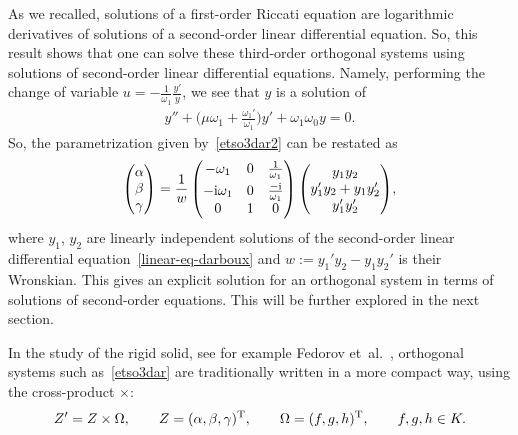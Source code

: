 \documentclass[pdftex]{sigma}%
\numberwithin{equation}{section}
\begin{document}
\begin{Remark}\label{rmk-darboux-thm2}
As we recalled, solutions of a first-order Riccati equation are logarithmic derivatives of solutions of a second-order linear differential equation. So, this result shows that one can solve these third-order orthogonal systems using solutions of second-order linear differential equations.
Namely, performing the change of variable $u=-\frac{1}{\omega_1}\frac{y'}{y}$, we see that
$y$ is a solution of
\begin{gather}\label{linear-eq-darboux}
y''+\bigg( \mu \omega_1 + \frac{\omega_1'}{\omega_1}\bigg) y' + \omega_1 \omega_0 y = 0.
\end{gather}
So, the parametrization given by~\eqref{etso3dar2} can be restated as
\begin{gather*}
\begin{pmatrix}
\alpha \\ \beta \\ \gamma \end{pmatrix}	= \frac{1}{w}
\begin{pmatrix} - \omega_1 &0&{\frac {1}{\omega_{{1}}}}
\vspace{1mm}\\ -{\rm i}\omega_{{1}} &0&{\frac {-{\rm i}}{ \omega_{{1}} }}\\ 0&
1&0\end{pmatrix}
\begin{pmatrix} y_1y_2 \\ y_1'y_2+y_1y_2' \\ y_1'y_2'
\end{pmatrix}\!,
\end{gather*}
where $y_1$, $y_2$ are linearly independent solutions of the second-order linear differential equation~\eqref{linear-eq-darboux} and $w:=y_1'y_2-y_1y_2'$ is their Wronskian.
This gives an explicit solution for an orthogonal system in terms of solutions of second-order equations. This will be further explored in the next section.
\end{Remark}

In the study of the rigid solid, see for example Fedorov et~al.~\cite{femapr, femapr0}, orthogonal systems such as~\eqref{etso3dar} are traditionally written in a more compact way, using the cross-product $\times$:
\begin{gather}\label{fedo}
 Z'=Z \times \Omega,\qquad Z=(\alpha,\beta,\gamma)^{\rm T}, \qquad \Omega=(f,g,h)^{\rm T}, \qquad f,g,h\in K.
\end{gather}
\end{document}

